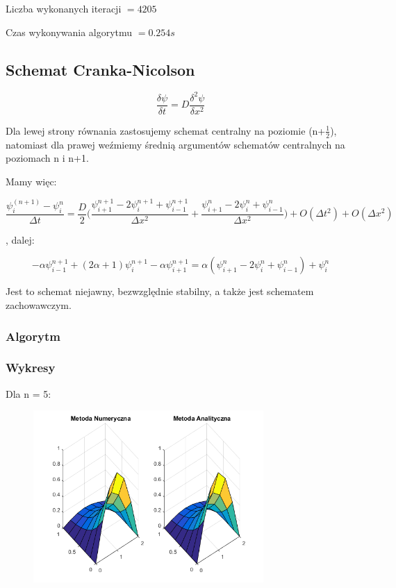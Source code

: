 Liczba wykonanych iteracji $ = 4205 $

Czas wykonywania algorytmu $ = 0.254 s$
\newpage

\newpage
\subsection{Schemat Cranka-Nicolson}

$$\dfrac{\delta \psi}{\delta t} = D\dfrac{\delta^2 \psi}{\delta x^2}$$

Dla lewej strony równania zastosujemy schemat centralny na poziomie (n+$\frac{1}{2}$), natomiast dla prawej weźmiemy średnią argumentów schematów centralnych na poziomach n i n+1.

Mamy więc:

$$\dfrac{\psi^{(n+1)}_{i}-\psi^n_{i}}{\Delta t}=\dfrac{D}{2}\Bigg(\dfrac{\psi^{n+1}_{i+1}-2\psi^{n+1}_{i}+\psi^{n+1}_{i-1}}{\Delta x^2} + \dfrac{\psi^{n}_{i+1}-2\psi^{n}_{i}+\psi^{n}_{i-1}}{\Delta x^2}\Bigg) + O(\Delta t^2) + O(\Delta x^2) $$

, dalej:

$$-\alpha\psi^{n+1}_{i-1}+(2\alpha+1)\psi^{n+1}_{i}-\alpha\psi^{n+1}_{i+1}=\alpha(\psi^{n}_{i+1}-2\psi^{n}_{i}+\psi^{n}_{i-1})+\psi^{n}_{i}$$

Jest to schemat niejawny, bezwzględnie stabilny, a także jest schematem zachowawczym.

\subsubsection{Algorytm}

\subsubsection{Wykresy}

Dla n = 5:

\begin{figure}[!ht]
	\begin{center}
		\includegraphics[width=0.78\textwidth]{Lab7/charts/cn/5.png}
	\end{center}
\end{figure}

